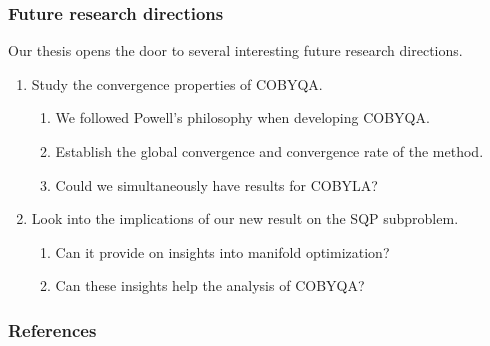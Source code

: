 \documentclass{polyu-presentation}
\begin{document}
\begin{frame}
    \frametitle{Future research directions}

    Our thesis opens the door to several interesting future research directions.
    \begin{enumerate}
        \item Study the \alert{convergence} properties of COBYQA.
        \begin{enumerate}
            \item We followed Powell's philosophy when developing COBYQA.
            \item Establish the global convergence and convergence rate of the method.
            \item Could we simultaneously have results for COBYLA?
        \end{enumerate}
        \item Look into the \alert{implications} of our new result on the SQP subproblem.
        \begin{enumerate}
            \item Can it provide on insights into \alert{manifold optimization}?
            \item Can these insights help the analysis of COBYQA?
        \end{enumerate}
    \end{enumerate}
\end{frame}

\appendix

\begin{frame}[t,allowframebreaks]
    \frametitle{References}

	\printbibliography
\end{frame}
\end{document}
